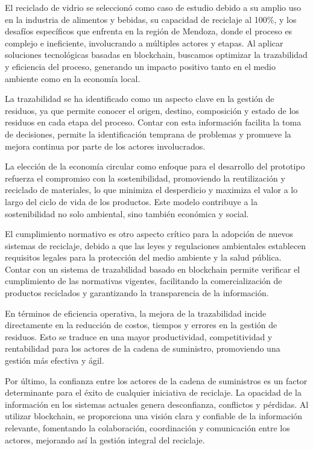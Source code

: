\documentclass[main.tex]{subfiles}
\begin{document}
El reciclado de vidrio se seleccionó como caso de estudio debido a su amplio uso en la industria de alimentos y bebidas, su capacidad de reciclaje al 100\%, y los desafíos específicos que enfrenta en la región de Mendoza, donde el proceso es complejo e ineficiente, involucrando a múltiples actores y etapas. Al aplicar soluciones tecnológicas basadas en blockchain, buscamos optimizar la trazabilidad y eficiencia del proceso, generando un impacto positivo tanto en el medio ambiente como en la economía local.

La trazabilidad se ha identificado como un aspecto clave en la gestión de residuos, ya que permite conocer el origen, destino, composición y estado de los residuos en cada etapa del proceso. Contar con esta información facilita la toma de decisiones, permite la identificación temprana de problemas y promueve la mejora continua por parte de los actores involucrados.

La elección de la economía circular como enfoque para el desarrollo del prototipo refuerza el compromiso con la sostenibilidad, promoviendo la reutilización y reciclado de materiales, lo que minimiza el desperdicio y maximiza el valor a lo largo del ciclo de vida de los productos. Este modelo contribuye a la sostenibilidad no solo ambiental, sino también económica y social.

El cumplimiento normativo es otro aspecto crítico para la adopción de nuevos sistemas de reciclaje, debido a que las leyes y regulaciones ambientales establecen requisitos legales para la protección del medio ambiente y la salud pública. Contar con un sistema de trazabilidad basado en blockchain permite verificar el cumplimiento de las normativas vigentes, facilitando la comercialización de productos reciclados y garantizando la transparencia de la información.

En términos de eficiencia operativa, la mejora de la trazabilidad incide directamente en la reducción de costos, tiempos y errores en la gestión de residuos. Esto se traduce en una mayor productividad, competitividad y rentabilidad para los actores de la cadena de suministro, promoviendo una gestión más efectiva y ágil.

Por último, la confianza entre los actores de la cadena de suministros es un factor determinante para el éxito de cualquier iniciativa de reciclaje. La opacidad de la información en los sistemas actuales genera desconfianza, conflictos y pérdidas. Al utilizar blockchain, se proporciona una visión clara y confiable de la información relevante, fomentando la colaboración, coordinación y comunicación entre los actores, mejorando así la gestión integral del reciclaje.
\end{document}
